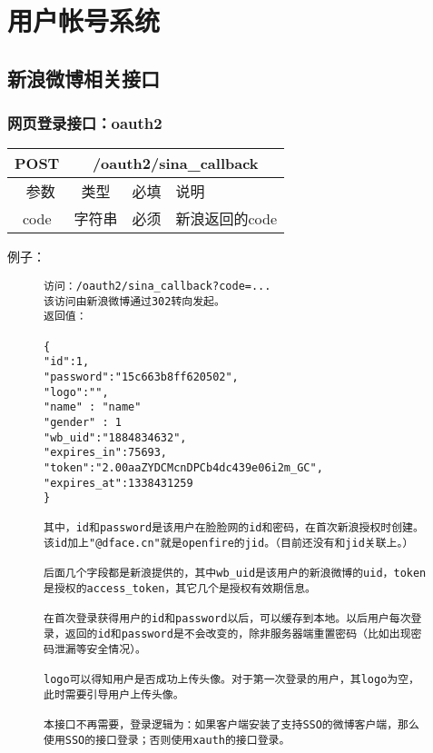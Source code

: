 
\section{用户帐号系统}
\subsection{新浪微博相关接口}

\subsubsection{网页登录接口：oauth2}


\begin{table}[H]
   \begin{center}
\begin{tabular}{|c|c|c|p{12cm}|}
\hline
POST & \multicolumn{3}{|c|}{/oauth2/sina\_callback} \\
\hline\hline
 \  参数  & 类型 & 必填 &  说明  \\
\hline
 code  & 字符串 & 必须 &  新浪返回的code\\
\hline
\end{tabular}
   \end{center}
\end{table}


例子：

\begin{figure}[H]
\begin{verbatim}
访问：/oauth2/sina_callback?code=...
该访问由新浪微博通过302转向发起。
返回值：

{
"id":1,
"password":"15c663b8ff620502",
"logo":"",
"name" : "name"
"gender" : 1
"wb_uid":"1884834632",
"expires_in":75693,
"token":"2.00aaZYDCMcnDPCb4dc439e06i2m_GC",
"expires_at":1338431259
}

其中，id和password是该用户在脸脸网的id和密码，在首次新浪授权时创建。该id加上"@dface.cn"就是openfire的jid。（目前还没有和jid关联上。）

后面几个字段都是新浪提供的，其中wb_uid是该用户的新浪微博的uid，token是授权的access_token，其它几个是授权有效期信息。

在首次登录获得用户的id和password以后，可以缓存到本地。以后用户每次登录，返回的id和password是不会改变的，除非服务器端重置密码（比如出现密码泄漏等安全情况）。

logo可以得知用户是否成功上传头像。对于第一次登录的用户，其logo为空，此时需要引导用户上传头像。

本接口不再需要，登录逻辑为：如果客户端安装了支持SSO的微博客户端，那么使用SSO的接口登录；否则使用xauth的接口登录。


\end{verbatim}
\end{figure}

